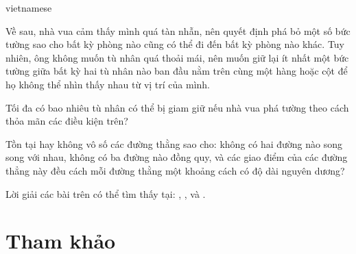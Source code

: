 \documentclass{article}
\begin{document}
\begin{otherlanguage*}{vietnamese}
\begin{problem*}
    Về sau, nhà vua cảm thấy mình quá tàn nhẫn, nên quyết định phá bỏ một số bức tường sao cho bất kỳ phòng nào cũng có thể đi đến bất kỳ phòng nào khác.
    Tuy nhiên, ông không muốn tù nhân quá thoải mái, nên muốn giữ lại ít nhất một bức tường
    giữa bất kỳ hai tù nhân nào ban đầu nằm trên cùng một hàng hoặc cột để họ không thể nhìn thấy nhau từ vị trí của mình.

    Tối đa có bao nhiêu tù nhân có thể bị giam giữ nếu nhà vua phá tường theo cách thỏa mãn các điều kiện trên?
\end{problem*}

\begin{problem*}
    Tồn tại hay không vô số các đường thằng sao cho: không có hai đường nào song song với nhau, không có ba đường nào đồng quy,
    và các giao điểm của các đường thẳng này đều cách mỗi đường thằng một khoảng cách có độ dài nguyên dương?
\end{problem*}

\begin{remark*}
    Lời giải các bài trên có thể tìm thấy tại: \cite{18KC_mo}, \cite{18KD_mo}, và \cite{18KE_mo}.
\end{remark*}

\newpage

\section*{Tham khảo}


\end{otherlanguage*}
\end{document}
